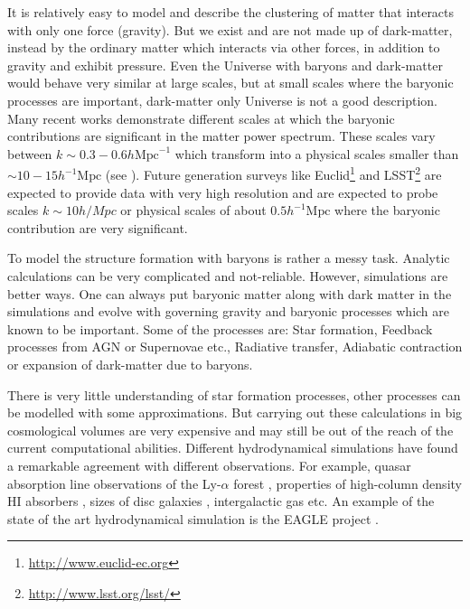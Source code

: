 It is relatively easy to model and describe the clustering of matter that interacts with only 
one force (gravity). But we exist and are not made up of dark-matter, instead by the
ordinary matter which interacts via other forces, in addition to gravity and exhibit pressure. 
Even the Universe with baryons and dark-matter would behave very similar at large scales,
but at small scales where the baryonic processes are important, dark-matter only Universe is
not a good description. Many recent works demonstrate different scales at which the baryonic
contributions are significant in the matter power spectrum. These scales vary between
$k\sim 0.3-0.6 h \mathrm{Mpc}^{-1}$ which transform into a physical scales smaller than
$\sim 10-15 h^{-1} \mathrm{Mpc}$ (see \cite{2011MNRAS.415.3649V,2014MNRAS.440.2997V}). 
Future generation surveys like Euclid\footnote{\url{http://www.euclid-ec.org}} 
\cite{2010arXiv1001.0061R,2013LRR....16....6A} and LSST\footnote{\url{http://www.lsst.org/lsst/}} 
\cite{2009arXiv0912.0201L} are
expected to provide data with very high resolution and are expected to probe scales $k \sim 10 h/Mpc$
or physical scales of about $0.5 h^{-1} \mathrm{Mpc}$ where the baryonic contribution 
are very significant.

To model the structure formation with baryons is rather a messy task. Analytic calculations
can be very complicated and not-reliable. However, simulations are better ways. One can always
put baryonic matter along with dark matter in the simulations and evolve with governing gravity and
baryonic processes which are known to be important. Some of the processes are: 
Star formation,
Feedback processes from AGN or Supernovae etc.,
Radiative transfer,
Adiabatic contraction or expansion of dark-matter due to baryons.

There is very little understanding of star formation processes, other processes can be 
modelled with some approximations. But carrying out these calculations in big cosmological 
volumes are very expensive and may still be out of the reach of the current computational 
abilities. 
Different hydrodynamical simulations have found a remarkable agreement
with different observations. For example, quasar absorption line observations
of the Ly-$\alpha$ forest \cite{1994ApJ...437L...9C,1998MNRAS.297L..49T,1998ApJ...495...44C}, 
properties of high-column density HI absorbers \cite{2008MNRAS.390.1349P,2011ApJ...743...82M,2013MNRAS.430.2427R}, sizes of disc galaxies \cite{2004ApJ...607..688G,2011MNRAS.410.1391A,2011ApJ...742...76G,2013MNRAS.436.3031V,2014MNRAS.437.1750M}, intergalactic
gas \cite{2012MNRAS.420..829O,2012MNRAS.425.1270S} etc. An example of the state of the art 
hydrodynamical simulation is the
EAGLE project \cite{2015MNRAS.446..521S}. 


